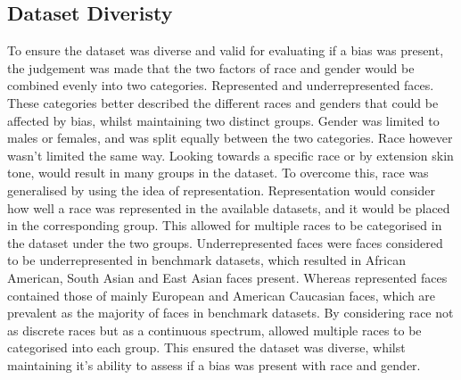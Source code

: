 \documentclass{l4proj}
\begin{document}
\subsection{Dataset Diveristy}

To ensure the dataset was diverse and valid for evaluating if a bias was present, the judgement was made that the two factors of race and gender would be combined evenly into two categories. Represented and underrepresented faces. These categories better described the different races and genders that could be affected by bias, whilst maintaining two distinct groups. Gender was limited to males or females, and was split equally between the two categories. Race however wasn't limited the same way. Looking towards a specific race or by extension skin tone, would result in many groups in the dataset. To overcome this, race was generalised by using the idea of representation. Representation would consider how well a race was represented in the available datasets, and it would be placed in the corresponding group. This allowed for multiple races to be categorised in the dataset under the two groups. Underrepresented faces were faces considered to be underrepresented in benchmark datasets, which resulted in African American, South Asian and East Asian faces present. Whereas represented faces contained those of mainly European and American Caucasian faces, which are prevalent as the majority of faces in benchmark datasets. By considering race not as discrete races but as a continuous spectrum, allowed multiple races to be categorised into each group. This ensured the dataset was diverse, whilst maintaining it's ability to assess if a bias was present with race and gender.





\end{document}
